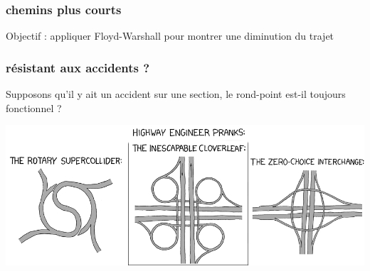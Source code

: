 \documentclass[slidetop,11pt]{beamer}
\begin{document}
\begin{frame}
	\frametitle{chemins plus courts}
	Objectif : appliquer Floyd-Warshall pour montrer une diminution du trajet
\end{frame}

\begin{frame}
	\frametitle{résistant aux accidents ?}
	Supposons qu'il y ait un accident sur une section, le rond-point est-il toujours fonctionnel ?
\end{frame}

\begin{frame}
	\includegraphics[scale=3]{./images/highway-engineers-pranks-hz}
\end{frame}
\end{document}
